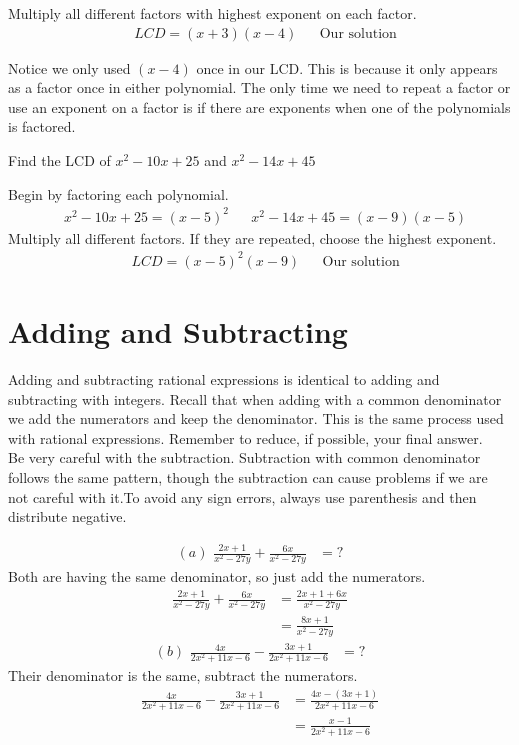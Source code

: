 Multiply all different factors with highest exponent on each factor. 
\begin{align*}
		&LCD = (x+3)(x-4) &&\text{Our solution}
\end{align*}
\begin{nt}Notice we only used $(x -4)$ once in our LCD. This is because it only appears as a factor once in either polynomial. The only time we need to repeat a factor or use an exponent on a factor is if there are exponents when one of the polynomials is factored.\\
\end{nt}
\begin{exa}
	Find the LCD of $x^2-10x+25$ and $x^2-14x+45$
\end{exa}
Begin by factoring each polynomial.
\begin{align*}
		&x^2-10x+25 = (x-5)^2	&	&x^2-14x+45=(x-9)(x-5)
\end{align*}
Multiply all different factors. If they are repeated, choose the highest exponent.
\begin{align*}
		&LCD = (x-5)^2(x-9) &&\text{Our solution}
\end{align*}
\section{Adding and Subtracting}
Adding and subtracting rational expressions is identical to adding and subtracting with integers. Recall that when adding with a common denominator we add the numerators and keep the denominator. This is the same process used with rational expressions. Remember to reduce, if possible, your final answer.\\
Be very careful with the subtraction. Subtraction with common denominator follows the same pattern, though the subtraction can cause problems if we are not careful with it.To avoid any sign errors,  always use parenthesis and then distribute 
negative.
\begin{exa}
	\begin{align*}
			(a)\,\, \frac{2x+1}{x^2-27y} +\frac{6x}{x^2-27y} &=?
	\end{align*}
Both are having the same denominator, so just add the numerators.
	\begin{align*}
			\frac{2x+1}{x^2-27y} +\frac{6x}{x^2-27y} &=\frac{2x+1+6x}{x^2-27y}\\
            &=\frac{8x+1}{x^2-27y}
	\end{align*}
	\begin{align*}
		(b)\,\, \frac{4x}{2x^2+11x-6}-\frac{3x+1}{2x^2+11x-6} &=?
	\end{align*}
Their denominator is the same, subtract the numerators.
	\begin{align*}
		\frac{4x}{2x^2+11x-6}-\frac{3x+1}{2x^2+11x-6} &=\frac{4x-(3x+1)}
        												{2x^2+11x-6} \\
        &=\frac{x-1}{2x^2+11x-6}
	\end{align*}
\end{exa}

